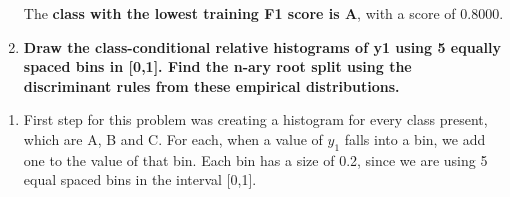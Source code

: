 \documentclass[12pt]{article}
\begin{document}
\begin{enumerate}[leftmargin=\labelsep]
The \textbf{class with the lowest training F1 score is A}, with a score of 0.8000.


\vspace{1cm}

\item  \textbf{Draw the class-conditional relative histograms of y1 using 5 equally spaced bins in
[0,1]. Find the n-ary root split using the discriminant rules from these empirical
distributions.}

\end{enumerate}
\begin{enumerate}
    \item First step for this problem was creating a histogram for every class present, which are A, B and C. For each, when a value of $y_1$ falls into a bin, we add one to the value of that bin. Each bin has a size of 0.2, since we are using 5 equal spaced bins in the interval [0,1].


\end{enumerate}
\end{document}
